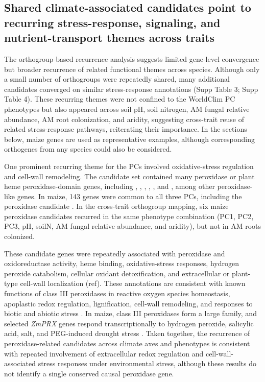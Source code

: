 \documentclass[unnumsec,webpdf,contemporary,large]{oup-authoring-template}%
\theoremstyle{thmstyleone}%
\theoremstyle{thmstyletwo}%
\theoremstyle{thmstylethree}%
\begin{document}
\subsection{Shared climate-associated candidates point to recurring stress-response, signaling, and nutrient-transport themes across traits}

The orthogroup-based recurrence analysis suggests limited gene-level convergence but broader recurrence of related functional themes across species. Although only a small number of orthogroups were repeatedly shared, many additional candidates converged on similar stress-response annotations (Supp Table 3; Supp Table 4). These recurring themes were not confined to the WorldClim PC phenotypes but also appeared across soil pH, soil nitrogen, AM fungal relative abundance, AM root colonization, and aridity, suggesting cross-trait reuse of related stress-response pathways, reiterating their importance. In the sections below, maize genes are used as representative examples, although corresponding orthogenes from any species could also be considered.

One prominent recurring theme for the PCs involved oxidative-stress regulation and cell-wall remodeling. The candidate set contained many peroxidase or plant heme peroxidase-domain genes, including \textit{}, \textit{}, \textit{}, \textit{}, \textit{}, and \textit{}, among other peroxidase-like genes. In maize, 143 genes were common to all three PCs, including the peroxidase candidate \textit{}. In the cross-trait orthogroup mapping, six maize peroxidase candidates recurred in the same phenotype combination (PC1, PC2, PC3, pH, soilN, AM fungal relative abundance, and aridity), but not in AM roots colonized.

These candidate genes were repeatedly associated with peroxidase and oxidoreductase activity, heme binding, oxidative-stress responses, hydrogen peroxide catabolism, cellular oxidant detoxification, and extracellular or plant-type cell-wall localization (ref). These annotations are consistent with known functions of class III peroxidases in reactive oxygen species homeostasis, apoplastic redox regulation, lignification, cell-wall remodeling, and responses to biotic and abiotic stress \citep{Hiraga2001,Passardi2004,Cosio2009,Kidwai2020}. In maize, class III peroxidases form a large family, and selected \textit{ZmPRX} genes respond transcriptionally to hydrogen peroxide, salicylic acid, salt, and PEG-induced drought stress \citep{Wang2015Peroxidase}. Taken together, the recurrence of peroxidase-related candidates across climate axes and phenotypes is consistent with repeated involvement of extracellular redox regulation and cell-wall-associated stress responses under environmental stress, although these results do not identify a single conserved causal peroxidase gene.
\end{document}

